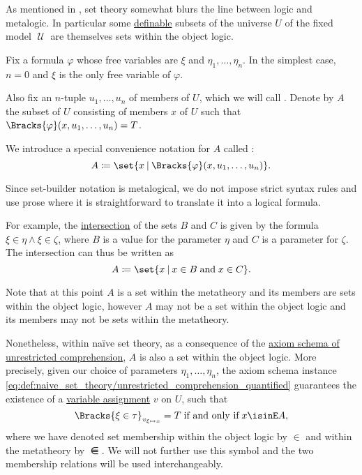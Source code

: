 \begin{definition}\label{def:set_builder_notation}
  As mentioned in , set theory somewhat blurs the line between logic and metalogic. In particular some \hyperref[def:first_order_definability]{definable} subsets of the universe \( U \) of the fixed model \( \mscrU \) are themselves sets within the object logic.

  Fix a formula \( \varphi \) whose free variables are \( \xi \) and \( \eta_1, \ldots, \eta_n \). In the simplest case, \( n = 0 \) and \( \xi \) is the only free variable of \( \varphi \).

  Also fix an \( n \)-tuple \( u_1, \ldots, u_n \) of members of \( U \), which we will call . Denote by \( A \) the subset of \( U \) consisting of members \( x \) of \( U \) such that \( \Bracks{\varphi}(x, u_1, \ldots, u_n) = T \).

  We introduce a special convenience notation for \( A \) called :
  \begin{equation*}
    A \coloneqq \set{ x \given \Bracks{\varphi}(x, u_1, \ldots, u_n) }.
  \end{equation*}

  Since set-builder notation is metalogical, we do not impose strict syntax rules and use prose where it is straightforward to translate it into a logical formula.

  For example, the \hyperref[def:basic_set_operations/intersection]{intersection} of the sets \( B \) and \( C \) is given by the formula \( \xi \in \eta \wedge \xi \in \zeta \), where \( B \) is a value for the parameter \( \eta \) and \( C \) is a parameter for \( \zeta \). The intersection can thus be written as
  \begin{equation*}
    A \coloneqq \set{ x \given x \in B \T{and} x \in C }.
  \end{equation*}

  Note that at this point \( A \) is a set within the metatheory and its members are sets within the object logic, however \( A \) may not be a set within the object logic and its members may not be sets within the metatheory.

  Nonetheless, within na\"ive set theory, as a consequence of the \hyperref[def:naive_set_theory/unrestricted_comprehension]{axiom schema of unrestricted comprehension}, \( A \) is also a set within the object logic. More precisely, given our choice of parameters \( \eta_1, \ldots, \eta_n \), the axiom schema instance \eqref{eq:def:naive_set_theory/unrestricted_comprehension_quantified} guarantees the existence of a \hyperref[def:first_order_valuation/variable_assignment]{variable assignment} \( v \) on \( U \), such that
  \begin{equation*}
    \Bracks{ \xi \in \tau }_{ v_{\xi \mapsto x} } = T
    \T{if and only if}
    x \isinE A,
  \end{equation*}
  where we have denoted set membership within the object logic by \( \in \) and within the metatheory by \( \isinE \). We will not further use this symbol and the two membership relations will be used interchangeably.


\end{definition}
